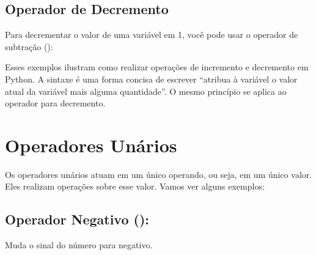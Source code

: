 \documentclass[letterpaper,10pt,english]{jupyterBook}
\begin{document}
\begin{sphinxVerbatim}[commandchars=\\\{\}]
\end{sphinxVerbatim}


\subsection{Operador de Decremento}
\label{\detokenize{chapters/ch3/ch3:operador-de-decremento}}
\sphinxAtStartPar
Para decrementar o valor de uma variável em 1, você pode usar o operador de subtração (\sphinxcode{\sphinxupquote{\sphinxhyphen{}=}}):

\begin{sphinxVerbatim}[commandchars=\\\{\}]
  
    
\end{sphinxVerbatim}

\begin{sphinxVerbatim}[commandchars=\\\{\}]
\end{sphinxVerbatim}

\sphinxAtStartPar
Esses exemplos ilustram como realizar operações de incremento e decremento em Python. A sintaxe \sphinxcode{\sphinxupquote{+=}} é uma forma concisa de escrever “atribua à variável o valor atual da variável mais alguma quantidade”. O mesmo princípio se aplica ao operador \sphinxcode{\sphinxupquote{\sphinxhyphen{}=}} para decremento.


\section{Operadores Unários}
\label{\detokenize{chapters/ch3/ch3:operadores-unarios}}
\sphinxAtStartPar
Os operadores unários atuam em um único operando, ou seja, em um único valor. Eles realizam operações sobre esse valor. Vamos ver alguns exemplos:


\subsection{Operador Negativo (\sphinxstyleliteralintitle{\sphinxupquote{\sphinxhyphen{}}}):}
\label{\detokenize{chapters/ch3/ch3:operador-negativo}}
\sphinxAtStartPar
Muda o sinal do número para negativo.
\end{document}
